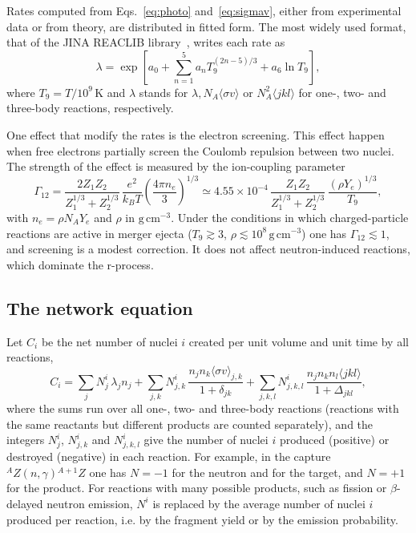Rates computed from Eqs.~\ref{eq:photo} and~\ref{eq:sigmav}, either from experimental data or from theory, are distributed in fitted form.
The most widely used format, that of the JINA REACLIB library~\cite{cyburt_jina_2010}, writes each rate as
\begin{equation}\label{eq:reaclib}
  \lambda=\exp\left[a_0+\sum_{n=1}^{5}a_nT_9^{(2n-5)/3}+a_6\ln T_9\right],
\end{equation}
where $T_9=T/10^9\,\mathrm{K}$ and $\lambda$ stands for $\lambda, N_A\langle\sigma v\rangle$ or $N_A^2\langle jkl\rangle$ for one-, two- and three-body reactions, respectively.

One effect that modify the rates is the electron screening. 
This effect happen when free electrons partially screen the Coulomb repulsion between two nuclei.
The strength of the effect is measured by the ion-coupling parameter~\cite{reichert_nuclear_2023}
\begin{equation}\label{eq:gamma12}
  \Gamma_{12}=\frac{2Z_1Z_2}{Z_1^{1/3}+Z_2^{1/3}}\,\frac{e^2}{k_BT}\left(\frac{4\pi n_e}{3}\right)^{1/3}\simeq4.55\times10^{-4}\,\frac{Z_1Z_2}{Z_1^{1/3}+Z_2^{1/3}}\,\frac{(\rho Y_e)^{1/3}}{T_9},
\end{equation}
with $n_e=\rho N_AY_e$ and $\rho$ in $\mathrm{g\,cm^{-3}}$.
Under the conditions in which charged-particle reactions are active in merger ejecta ($T_9\gtrsim3$, $\rho\lesssim10^{8}\,\mathrm{g\,cm^{-3}}$) one has $\Gamma_{12}\lesssim1$, and screening is a modest correction.
It does not affect neutron-induced reactions, which dominate the r-process.

\subsection{The network equation}\label{sec:network_eq}

Let $C_i$ be the net number of nuclei $i$ created per unit volume and unit time by all reactions,
\begin{equation}\label{eq:Ci}
  C_i=\sum_j N^i_j\,\lambda_jn_j+\sum_{j,k}N^i_{j,k}\,\frac{n_jn_k\langle\sigma v\rangle_{j,k}}{1+\delta_{jk}}+\sum_{j,k,l}N^i_{j,k,l}\,\frac{n_jn_kn_l\langle jkl\rangle}{1+\Delta_{jkl}},
\end{equation}
where the sums run over all one-, two- and three-body reactions (reactions with the same reactants but different products are counted separately), and the integers $N^i_{j}$, $N^i_{j,k}$ and $N^i_{j,k,l}$ give the number of nuclei $i$ produced (positive) or destroyed (negative) in each reaction.
For example, in the capture ${}^{A}Z(n,\gamma){}^{A+1}Z$ one has $N=-1$ for the neutron and for the target, and $N=+1$ for the product.
For reactions with many possible products, such as fission or $\beta$-delayed neutron emission, $N^i$ is replaced by the average number of nuclei $i$ produced per reaction, i.e. by the fragment yield or by the emission probability.

